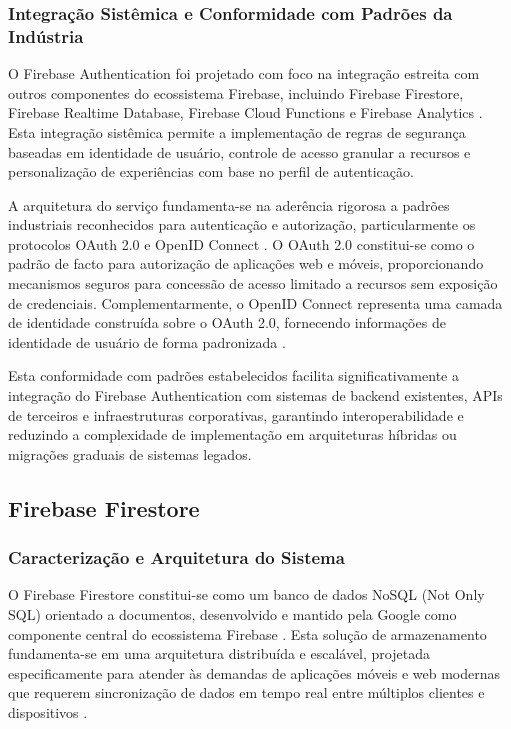 \documentclass[
	12pt,				    %
	openright,			    %
	oneside,			    %
	a4paper,			    %
    sumario=tradicional,    %
	english,			    %
	brazil,				    %
	]{abntex2}              %
\begin{document}
\subsubsection{Integração Sistêmica e Conformidade com Padrões da Indústria}

O Firebase Authentication foi projetado com foco na integração estreita com outros componentes do ecossistema Firebase, incluindo Firebase Firestore, Firebase Realtime Database, Firebase Cloud Functions e Firebase Analytics \cite{firebase2023ecosystem}. Esta integração sistêmica permite a implementação de regras de segurança baseadas em identidade de usuário, controle de acesso granular a recursos e personalização de experiências com base no perfil de autenticação.

A arquitetura do serviço fundamenta-se na aderência rigorosa a padrões industriais reconhecidos para autenticação e autorização, particularmente os protocolos OAuth 2.0 e OpenID Connect \cite{hardt2012oauth}. O OAuth 2.0 constitui-se como o padrão de facto para autorização de aplicações web e móveis, proporcionando mecanismos seguros para concessão de acesso limitado a recursos sem exposição de credenciais. Complementarmente, o OpenID Connect representa uma camada de identidade construída sobre o OAuth 2.0, fornecendo informações de identidade de usuário de forma padronizada \cite{sakimura2014openid}.

Esta conformidade com padrões estabelecidos facilita significativamente a integração do Firebase Authentication com sistemas de backend existentes, APIs de terceiros e infraestruturas corporativas, garantindo interoperabilidade e reduzindo a complexidade de implementação em arquiteturas híbridas ou migrações graduais de sistemas legados.


\subsection{Firebase Firestore}
\subsubsection{Caracterização e Arquitetura do Sistema}

O Firebase Firestore constitui-se como um banco de dados NoSQL (Not Only SQL) orientado a documentos, desenvolvido e mantido pela Google como componente central do ecossistema Firebase \cite{google2023firestore}. Esta solução de armazenamento fundamenta-se em uma arquitetura distribuída e escalável, projetada especificamente para atender às demandas de aplicações móveis e web modernas que requerem sincronização de dados em tempo real entre múltiplos clientes e dispositivos \cite{chang2008bigtable}.
\end{document}
